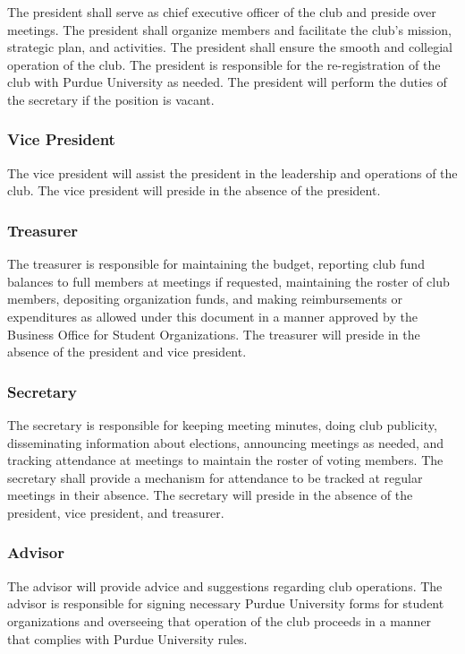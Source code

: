 \documentclass{article}
\begin{document}
The president shall serve as chief executive officer of the club and preside
over meetings. The president shall organize members and facilitate the club's
mission, strategic plan, and activities. The president shall ensure the smooth
and collegial operation of the club. The president is responsible for the
re-registration of the club with Purdue University as needed. The president will
perform the duties of the secretary if the position is vacant.

\subsubsection{Vice President}

The vice president will assist the president in the leadership and operations of
the club. The vice president will preside in the absence of the president.

\subsubsection{Treasurer}

The treasurer is responsible for maintaining the budget, reporting club fund
balances to full members at meetings if requested, maintaining the roster of
club members, depositing organization funds, and making reimbursements or
expenditures as allowed under this document in a manner approved by the Business
Office for Student Organizations. The treasurer will preside in the absence of
the president and vice president.

\subsubsection{Secretary}

The secretary is responsible for keeping meeting minutes, doing club publicity,
disseminating information about elections, announcing meetings as needed, and
tracking attendance at meetings to maintain the roster of voting members. The
secretary shall provide a mechanism for attendance to be tracked at regular
meetings in their absence. The secretary will preside in the absence of the
president, vice president, and treasurer.

\subsubsection{Advisor}

The advisor will provide advice and suggestions regarding club operations. The
advisor is responsible for signing necessary Purdue University forms for student
organizations and overseeing that operation of the club proceeds in a manner
that complies with Purdue University rules.
\end{document}
